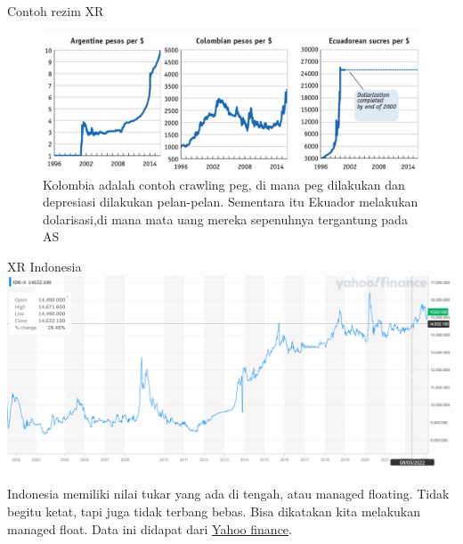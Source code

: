 \documentclass[
  ignorenonframetext,
]{beamer}
\begin{document}
\begin{frame}{Contoh rezim XR}
\label{contoh-rezim-xr-3}
\begin{figure}[H]

{\centering \includegraphics{Picture5.jpg}

}

\caption{Kolombia adalah contoh crawling peg, di mana peg dilakukan dan
depresiasi dilakukan pelan-pelan. Sementara itu Ekuador melakukan
dolarisasi,di mana mata uang mereka sepenuhnya tergantung pada AS}

\end{figure}%
\end{frame}

\begin{frame}{XR Indonesia}
\label{xr-indonesia}
\includegraphics{idr2.png}

Indonesia memiliki nilai tukar yang ada di tengah, atau managed
floating. Tidak begitu ketat, tapi juga tidak terbang bebas. Bisa
dikatakan kita melakukan managed float. Data ini didapat dari
\href{https://yhoo.it/3ZaTko7}{Yahoo finance}.
\end{frame}
\end{document}
